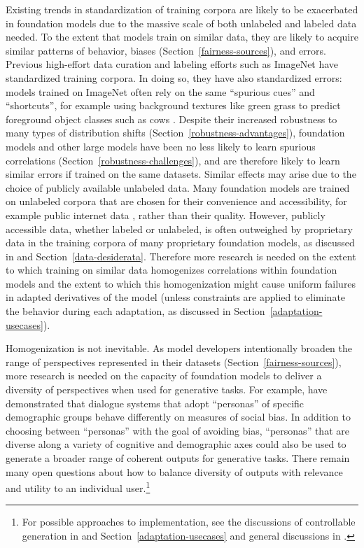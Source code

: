 Existing trends in standardization of training corpora are likely to be exacerbated  in foundation models due to the massive scale of both unlabeled and labeled data needed. To the extent that models train on similar data, they are likely to acquire similar patterns of behavior, biases (Section~\ref{fairness-sources}), and errors. Previous high-effort data curation and labeling efforts such as ImageNet have standardized training corpora. In doing so, they have also standardized errors: models trained on ImageNet often rely on the same ``spurious cues'' and ``shortcuts'', for example using background textures like green grass to predict foreground object classes such as cows \citep{geirhos2020shortcut, hendrycks2021natural}. Despite their increased robustness to many types of distribution shifts (Section~\ref{robustness-advantages}), foundation models and other large models have been no less likely to learn spurious correlations (Section~\ref{robustness-challenges}), and are therefore likely to learn similar errors if trained on the same datasets. Similar effects may arise due to the choice of publicly available unlabeled data. Many foundation models are trained on unlabeled corpora that are chosen for their convenience and accessibility, for example public internet data \citep{caswell2021}, rather than their quality. However, publicly accessible data, whether labeled or unlabeled, is often outweighed by proprietary data in the training corpora of many proprietary foundation models, as discussed in \citep{marr2017} and Section~\ref{data-desiderata}. 
Therefore more research is needed on the extent to which training on similar data homogenizes correlations within foundation models and the extent to which this homogenization might cause uniform failures in adapted derivatives of the model (unless constraints are applied to eliminate the behavior during each adaptation, as discussed in Section~\ref{adaptation-usecases}). 

Homogenization is not inevitable. As model developers intentionally broaden the range of perspectives represented in their datasets (Section~\ref{fairness-sources}), more research is needed on the capacity of foundation models to deliver a diversity of perspectives when used for generative tasks. For example, \citet{sheng2021revealing} have demonstrated that dialogue systems that adopt ``personas'' of specific demographic groups behave differently on measures of social bias. In addition to choosing between ``personas'' with the goal of avoiding bias, ``personas'' that are diverse along a variety of cognitive and demographic axes could also be used to generate a broader range of coherent outputs for generative tasks. There remain many open questions about how to balance diversity of outputs with relevance and utility to an individual user.\footnote{For possible approaches to implementation, see the discussions of controllable generation in \citep{keskar2019ctrl} and Section~\ref{adaptation-usecases} and general discussions in \citep{dinan21}.} 

